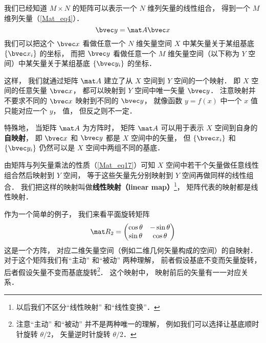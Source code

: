 


我们已经知道 $M\times N$ 的矩阵可以表示一个 $N$ 维列矢量的线性组合， 得到一个 $M$ 维列矢量（\autoref{Mat_eq4}）．
\begin{equation}\label{MatLS_eq1}
\bvec y = \mat A \bvec x
\end{equation}
我们可以把这个 $\bvec x$ 看做任意一个 $N$ 维矢量空间 $X$ 中某矢量关于某组基底 $\{\bvec x_i\}$ 的坐标， 而把 $\bvec y$ 看做任意一个 $M$ 维矢量空间（以下称为 $Y$ 空间）中某矢量关于某组基底 $\{\bvec y_i\}$ 的坐标．

这样， 我们就通过矩阵 $\mat A$ 建立了从 $X$ 空间到 $Y$ 空间的一个映射． 即 $X$ 空间的任意矢量 $\bvec x$， 都可以映射到 $Y$ 空间中唯一矢量 $\bvec y$． 注意映射并不要求不同的 $\bvec x$ 映射到不同的 $\bvec y$， 就像函数 $y = f(x)$ 中一个 $x$ 值只能对应一个 $y$， 值， 但反之则不一定．

特殊地， 当矩阵 $\mat A$ 为方阵时， 矩阵 $\mat A$ 可以用于表示 $X$ 空间到自身的\textbf{自映射}， 即 $\bvec x$ 和 $\bvec y$ 都是 $X$ 空间中的矢量， 但 $\{\bvec x_i\}$ 和 $\{\bvec y_i\}$ 仍然可以是 $X$ 空间中两组不同的基底．

由矩阵与列矢量乘法的性质（\autoref{Mat_eq17}）可知 $X$ 空间中若干个矢量做任意线性组合然后映射到 $Y$ 空间， 等于这些矢量先分别映射到 $Y$ 空间再做同样的线性组合． 我们把这样的映射叫做\textbf{线性映射（linear map）}\footnote{以后我们不区分“线性映射” 和“线性变换”．}， 矩阵代表的映射都是线性映射．

作为一个简单的例子， 我们来看平面旋转矩阵
\begin{equation}
\mat R_2 = \begin{pmatrix}
\cos\theta & - \sin\theta\\
\sin\theta &\cos\theta
\end{pmatrix}
\end{equation}
这是一个方阵， 对应二维矢量空间（例如二维几何矢量构成的空间）的自映射． 对于这个矩阵我们有“主动” 和“被动” 两种理解， 前者假设基底不变而矢量旋转， 后者假设矢量不变而基底旋转\footnote{注意“主动” 和“被动” 并不是两种唯一的理解， 例如我们可以选择让基底顺时针旋转 $\theta/2$， 矢量逆时针旋转 $\theta/2$．}． 这个映射中， 映射前后的矢量有一一对应关系．

